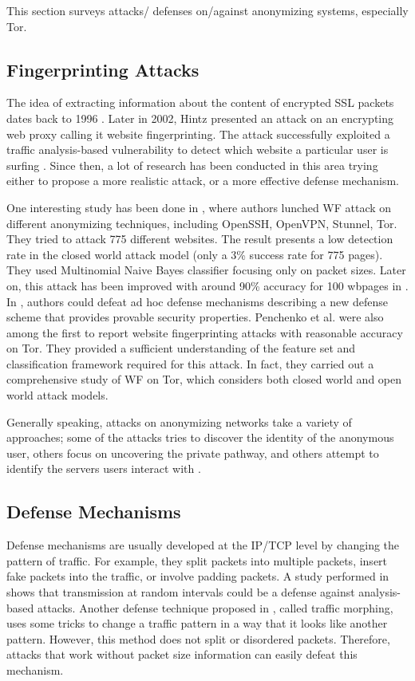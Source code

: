 
This section surveys attacks/ defenses on/against anonymizing systems, especially Tor.

\subsection{Fingerprinting Attacks}
The idea of extracting information about the content of encrypted SSL packets dates back to 1996 \cite{wagner96}. Later in 2002, Hintz presented an attack on an encrypting web proxy calling it website fingerprinting. The attack successfully exploited a traffic analysis-based vulnerability to detect which website a particular user is surfing \cite{hintz2003}. Since then, a lot of research has been conducted in this area trying either to propose a more realistic attack, or a more effective defense mechanism.

One interesting study has been done in \cite{herrmann2009}, where authors lunched WF attack on different anonymizing techniques, including OpenSSH, OpenVPN, Stunnel, Tor. They tried to attack 775 different websites. The result presents a low detection rate in the closed world attack model (only a 3\% success rate for 775 pages). They used Multinomial Naive Bayes classifier focusing only on packet sizes. Later on, this attack has been improved with around 90\% accuracy for 100 wbpages in \cite{wang2013improved, cai2012touching}. In \cite{cai2012touching}, authors could defeat ad hoc defense mechanisms describing a new defense scheme that provides provable security properties. Penchenko et al. \cite{panchenko11} were also among the first to report website fingerprinting attacks with reasonable accuracy on Tor. They provided a sufficient understanding of the feature set and classification framework required for this attack. In fact, they carried out a comprehensive study of WF on Tor, which considers both closed world and open world attack models.

Generally speaking, attacks on anonymizing networks take a variety of approaches; some of the attacks tries to discover the identity of the anonymous user, others focus on uncovering the private pathway, and others attempt to identify the servers users interact with  \cite{cai2012touching}.

\subsection{Defense Mechanisms}
Defense mechanisms are usually developed at the IP/TCP level by changing the pattern of traffic. For example, they split packets into multiple packets, insert fake packets into the traffic, or involve padding packets. A study performed in \cite{fu2003} shows that transmission at random intervals could be a defense against analysis-based attacks. Another defense technique proposed in \cite{wright2009}, called traffic morphing, uses some tricks to change a traffic pattern in a way that it looks like another pattern. However, this method does not split or disordered packets. Therefore, attacks that work without packet size information can easily defeat this mechanism.

